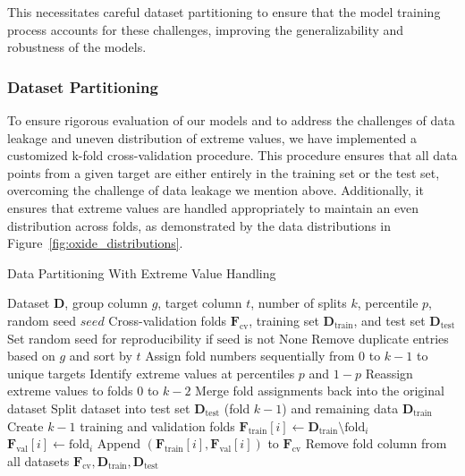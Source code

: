 This necessitates careful dataset partitioning to ensure that the model training process accounts for these challenges, improving the generalizability and robustness of the models.

\subsubsection{Dataset Partitioning}\label{subsubsec:dataset_partitioning}
To ensure rigorous evaluation of our models and to address the challenges of data leakage and uneven distribution of extreme values, we have implemented a customized k-fold cross-validation procedure.
This procedure ensures that all data points from a given target are either entirely in the training set or the test set, overcoming the challenge of data leakage we mention above.
Additionally, it ensures that extreme values are handled appropriately to maintain an even distribution across folds, as demonstrated by the data distributions in Figure~\ref{fig:oxide_distributions}.

\begin{algorithm}
\caption{Data Partitioning With Extreme Value Handling}
\label{alg:custom_kfold_cv}
\begin{algorithmic}[1]
\Require Dataset \( \mathbf{D} \), group column \( g \), target column \( t \), number of splits \( k \), percentile \( p \), random seed \( \textit{seed} \)
\Ensure Cross-validation folds \( \mathbf{F}_\text{cv} \), training set \( \mathbf{D}_\text{train} \), and test set \( \mathbf{D}_\text{test} \)
\State \label{line:seed} Set random seed for reproducibility if \(\text{seed} \) is not None
\State \label{line:remove_duplicates} Remove duplicate entries based on \( g \) and sort by \( t \)
\State \label{line:assign_folds} Assign fold numbers sequentially from 0 to \( k-1 \) to unique targets
    \State \label{line:identify_extremes} Identify extreme values at percentiles \( p \) and \( 1-p \)
    \State \label{line:reassign_extremes} Reassign extreme values to folds \( 0 \) to \( k-2 \)
\EndIf
\State \label{line:merge_folds} Merge fold assignments back into the original dataset
\State \label{line:split_dataset} Split dataset into test set \( \mathbf{D}_\text{test} \) (fold \( k-1 \)) and remaining data \( \mathbf{D}_\text{train} \)
\State \label{line:create_folds} Create \( k-1 \) training and validation folds
    \State \( \mathbf{F}_\text{train}[i] \gets \mathbf{D}_\text{train} \setminus \text{fold}_i \)
    \State \( \mathbf{F}_\text{val}[i] \gets \text{fold}_i \)
    \State Append \((\mathbf{F}_\text{train}[i], \mathbf{F}_\text{val}[i])\) to \(\mathbf{F}_\text{cv}\)
\EndFor
\State \label{line:remove_fold_column} Remove fold column from all datasets
\State \Return \( \mathbf{F}_\text{cv}, \mathbf{D}_\text{train}, \mathbf{D}_\text{test} \)
\end{algorithmic}
\end{algorithm}

